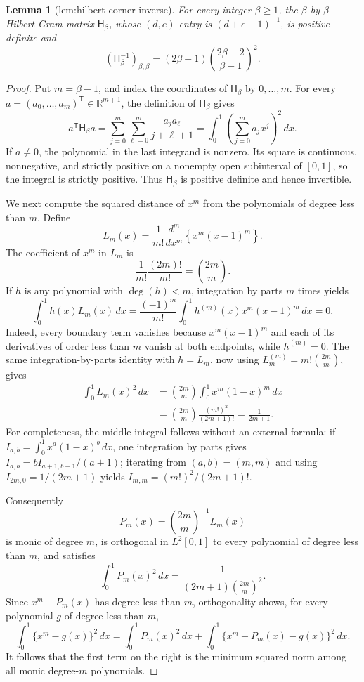 \documentclass{article}
\newtheorem{lemma}{Lemma}
\begin{document}
\begin{lemma}[lem:hilbert-corner-inverse]\label{lem:hilbert-corner-inverse}
For every integer \(\beta\ge1\), the \(\beta\)-by-\(\beta\) Hilbert Gram matrix \(\mathsf H_\beta\), whose \((d,e)\)-entry is \((d+e-1)^{-1}\), is positive definite and
\[
(\mathsf H_\beta^{-1})_{\beta,\beta}
=(2\beta-1)\binom{2\beta-2}{\beta-1}^{\!2}.
\]
\end{lemma}
\begin{proof}
Put \(m=\beta-1\), and index the coordinates of \(\mathsf H_\beta\) by \(0,\ldots,m\).  For every \(a=(a_0,\ldots,a_m)^{\mathsf T}\in\mathbb R^{m+1}\), the definition of \(\mathsf H_\beta\) gives
\[
a^{\mathsf T}\mathsf H_\beta a
=\sum_{j=0}^m\sum_{\ell=0}^m\frac{a_ja_\ell}{j+\ell+1}
=\int_0^1\left(\sum_{j=0}^m a_jx^j\right)^2\,dx.
\]
If \(a\ne0\), the polynomial in the last integrand is nonzero.  Its square is continuous, nonnegative, and strictly positive on a nonempty open subinterval of \([0,1]\), so the integral is strictly positive.  Thus \(\mathsf H_\beta\) is positive definite and hence invertible.

We next compute the squared distance of \(x^m\) from the polynomials of degree less than \(m\).  Define
\[
L_m(x)=\frac{1}{m!}\frac{d^m}{dx^m}\left\{x^m(x-1)^m\right\}.
\]
The coefficient of \(x^m\) in \(L_m\) is
\[
\frac{1}{m!}\frac{(2m)!}{m!}=\binom{2m}{m}.
\]
If \(h\) is any polynomial with \(\deg(h)<m\), integration by parts \(m\) times yields
\[
\int_0^1h(x)L_m(x)\,dx
=\frac{(-1)^m}{m!}\int_0^1h^{(m)}(x)x^m(x-1)^m\,dx
=0.
\]
Indeed, every boundary term vanishes because \(x^m(x-1)^m\) and each of its derivatives of order less than \(m\) vanish at both endpoints, while \(h^{(m)}=0\).  The same integration-by-parts identity with \(h=L_m\), now using \(L_m^{(m)}=m!\binom{2m}{m}\), gives
\[
\begin{aligned}
\int_0^1L_m(x)^2\,dx
&=\binom{2m}{m}\int_0^1x^m(1-x)^m\,dx\\
&=\binom{2m}{m}\frac{(m!)^2}{(2m+1)!}
=\frac{1}{2m+1}.
\end{aligned}
\]
For completeness, the middle integral follows without an external formula: if \(I_{a,b}=\int_0^1x^a(1-x)^b\,dx\), one integration by parts gives \(I_{a,b}=bI_{a+1,b-1}/(a+1)\); iterating from \((a,b)=(m,m)\) and using \(I_{2m,0}=1/(2m+1)\) yields \(I_{m,m}=(m!)^2/(2m+1)!\).

Consequently
\[
P_m(x)=\binom{2m}{m}^{-1}L_m(x)
\]
is monic of degree \(m\), is orthogonal in \(L^2[0,1]\) to every polynomial of degree less than \(m\), and satisfies
\[
\int_0^1P_m(x)^2\,dx
=\frac{1}{(2m+1)\binom{2m}{m}^{2}}.
\]
Since \(x^m-P_m(x)\) has degree less than \(m\), orthogonality shows, for every polynomial \(g\) of degree less than \(m\),
\[
\int_0^1\{x^m-g(x)\}^2\,dx
=\int_0^1P_m(x)^2\,dx
+\int_0^1\{x^m-P_m(x)-g(x)\}^2\,dx.
\]
It follows that the first term on the right is the minimum squared norm among all monic degree-\(m\) polynomials.


\end{proof}
\end{document}
